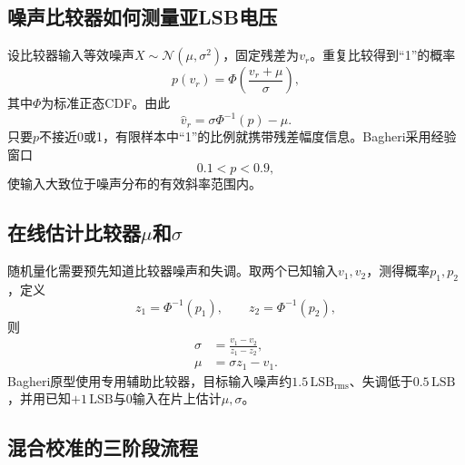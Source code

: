 \documentclass[UTF8,a4paper,11pt]{ctexart}
\newcommand{\LSB}{\mathrm{LSB}}
\begin{document}
\subsection{噪声比较器如何测量亚LSB电压}

设比较器输入等效噪声$X\sim\mathcal N(\mu,\sigma^2)$，固定残差为$v_r$。重复比较得到“1”的概率
\begin{equation}
p(v_r)=\Phi\!\left(\frac{v_r+\mu}{\sigma}\right),
\label{eq:prob_comp}
\end{equation}
其中$\Phi$为标准正态CDF。由此
\begin{equation}
\widehat v_r=\sigma\Phi^{-1}(p)-\mu.
\label{eq:stochastic_inverse}
\end{equation}
只要$p$不接近0或1，有限样本中“1”的比例就携带残差幅度信息。Bagheri采用经验窗口
\begin{equation}
0.1<p<0.9,
\end{equation}
使输入大致位于噪声分布的有效斜率范围内。

\subsection{在线估计比较器\texorpdfstring{$\mu$}{mu}和\texorpdfstring{$\sigma$}{sigma}}

随机量化需要预先知道比较器噪声和失调。取两个已知输入$v_1,v_2$，测得概率$p_1,p_2$，定义
\begin{equation}
z_1=\Phi^{-1}(p_1),\qquad z_2=\Phi^{-1}(p_2),
\end{equation}
则
\begin{align}
\sigma&=\frac{v_1-v_2}{z_1-z_2},\\
\mu&=\sigma z_1-v_1.
\end{align}
Bagheri原型使用专用辅助比较器，目标输入噪声约$1.5\,\LSB_{\mathrm{rms}}$、失调低于$0.5\,\LSB$，并用已知$+1\,\LSB$与0输入在片上估计$\mu,\sigma$。\cite{bagheri2020}

\subsection{混合校准的三阶段流程}
\end{document}
